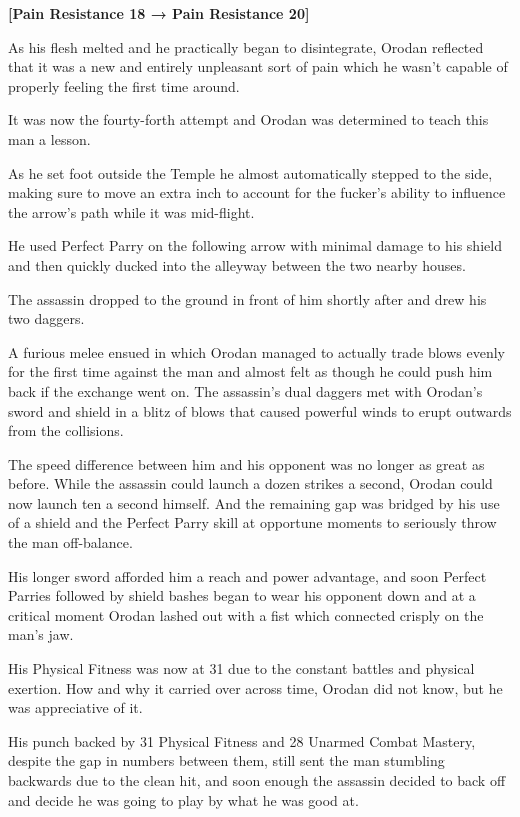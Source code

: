 \documentclass[a4paper,10pt]{book}
\begin{document}
\textbf{[Pain Resistance 18 → Pain Resistance 20]}\par
As his flesh melted and he practically began to disintegrate, Orodan reflected that it was a new and entirely unpleasant sort of pain which he wasn’t capable of properly feeling the first time around.\par
\par
It was now the fourty-forth attempt and Orodan was determined to teach this man a lesson.\par
As he set foot outside the Temple he almost automatically stepped to the side, making sure to move an extra inch to account for the fucker’s ability to influence the arrow’s path while it was mid-flight.\par
He used Perfect Parry on the following arrow with minimal damage to his shield and then quickly ducked into the alleyway between the two nearby houses.\par
The assassin dropped to the ground in front of him shortly after and drew his two daggers.\par
A furious melee ensued in which Orodan managed to actually trade blows evenly for the first time against the man and almost felt as though he could push him back if the exchange went on. The assassin’s dual daggers met with Orodan’s sword and shield in a blitz of blows that caused powerful winds to erupt outwards from the collisions.\par
The speed difference between him and his opponent was no longer as great as before. While the assassin could launch a dozen strikes a second, Orodan could now launch ten a second himself. And the remaining gap was bridged by his use of a shield and the Perfect Parry skill at opportune moments to seriously throw the man off-balance.\par
His longer sword afforded him a reach and power advantage, and soon Perfect Parries followed by shield bashes began to wear his opponent down and at a critical moment Orodan lashed out with a fist which connected crisply on the man’s jaw.\par
His Physical Fitness was now at 31 due to the constant battles and physical exertion. How and why it carried over across time, Orodan did not know, but he was appreciative of it.\par
His punch backed by 31 Physical Fitness and 28 Unarmed Combat Mastery, despite the gap in numbers between them, still sent the man stumbling backwards due to the clean hit, and soon enough the assassin decided to back off and decide he was going to play by what he was good at.\par
\end{document}
